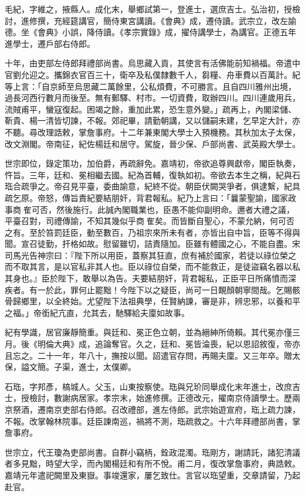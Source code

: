 \begin{pinyinscope}
毛紀，字維之，掖縣人。成化末，舉鄉試第一，登進士，選庶吉士。弘治初，授檢討，進修撰，充經筵講官，簡侍東宮講讀。《會典》成，遷侍讀。武宗立，改左諭德。坐《會典》小誤，降侍讀。《孝宗實錄》成，擢侍講學士，為講官。正德五年進學士，遷戶部右侍郎。

十年，由吏部左侍郎拜禮部尚書。烏思藏入貢，其使言有活佛能前知禍福。帝遣中官劉允迎之。攜錦衣官百三十，衛卒及私僕隸數千人，芻糧、舟車費以百萬計。紀等上言：「自京師至烏思藏二萬餘里，公私煩費，不可勝言。且自四川雅州出境，過長河西行數月而後至。無有郵驛、村市。一切資費，取辦四川。四川連歲用兵，流賊甫平，蠻寇復起。困竭之餘，重加此累，恐生意外變。」疏再上，內閣梁儲、靳貴、楊一清皆切諫，不報。郊祀畢，請勤朝講，又以儲嗣未建，乞早定大計，亦不聽。尋改理誥敕，掌詹事府。十二年兼東閣大學士入預機務。其秋加太子太保，改文淵閣。帝南征，紀佐楊廷和居守。駕旋，晉少保、戶部尚書、武英殿大學士。

世宗即位，錄定策功，加伯爵，再疏辭免。嘉靖初，帝欲追尊興獻帝，閣臣執奏，忤旨。三年，廷和、冕相繼去國。紀為首輔，復執如初。帝欲去本生之稱，紀與石珤合疏爭之。帝召見平臺，委曲諭意，紀終不從。朝臣伏闕哭爭者，俱逮繫，紀具疏乞原。帝怒，傳旨責紀要結朋奸，背君報私。紀乃上言曰：「曩蒙聖諭，國家政事商隺可否，然後施行。此誠內閣職業也，臣愚不能仰副明命。邇者大禮之議，平臺召對，司禮傳諭，不知其幾似乎商隺矣。而皆斷自聖心，不蒙允納，何可否之有。至於笞罰廷臣，動至數百，乃祖宗來所未有者，亦皆出自中旨，臣等不得與聞。宣召徒勤，扞格如故。慰留雖切，詰責隨加。臣雖有體國之心，不能自盡。宋司馬光告神宗曰：『陛下所以用臣，蓋察其狂直，庶有補於國家，若徒以祿位榮之而不取其言，是以官私非其人也。臣以祿位自榮，而不能救正，是徒盜竊名器以私其身也。』臣於陛下，敢舉以為告。夫要結朋奸，背君報私，正臣平日所痛憤而深疾者。有一於此，罪何止罷黜！今陛下以之疑臣，尚可一日靦顏朝寧間哉。乞賜骸骨歸鄉里，以全終始。尤望陛下法祖典學，任賢納諫，審是非，辨忠邪，以養和平之福。」帝銜紀亢直，允其去，馳驛給夫廩如故事。

紀有學識，居官廉靜簡重。與廷和、冕正色立朝，並為縉紳所倚賴。其代冕亦僅三月。後《明倫大典》成，追論奪官。久之，廷和、冕皆淪喪，紀以恩詔敘復，帝亦且忘之。二十一年，年八十，撫按以聞。詔遣官存問，再賜夫廩。又三年卒。贈太保，謚文簡。子渠，進士，太僕卿。

石珤，字邦彥，槁城人。父玉，山東按察使。珤與兄玠同舉成化末年進士，改庶吉士，授檢討，數謝病居家。孝宗末，始進修撰。正德改元，擢南京侍讀學士。歷兩京祭酒，遷南京吏部右侍郎。召改禮部，進左侍郎。武宗始遊宣府，珤上疏力諫，不報。改掌翰林院事。廷臣諫南巡，禍將不測，珤疏救之。十六年拜禮部尚書，掌詹事府。

世宗立，代王瓊為吏部尚書。自群小竊柄，銓政混濁。珤剛方，謝請託，諸犯清議者多見黜，時望大孚，而內閣楊廷和有所不悅。甫二月，復改掌詹事府，典誥敕。嘉靖元年遣祀闕里及東嶽。事竣還家，屢乞致仕。言官以珤望重，交章請留，乃起赴官。


\end{pinyinscope}
